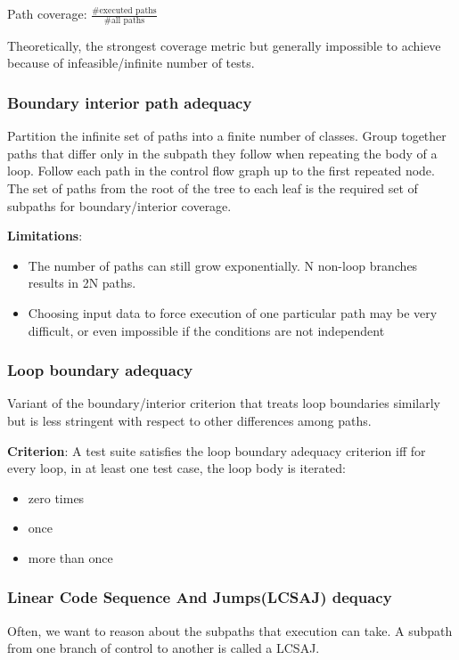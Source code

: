 \documentclass{article}
\begin{document}
Path coverage: 
$\frac{\text{\# executed paths}}{\text{\# all paths}}$

Theoretically, the strongest coverage metric but generally impossible to achieve because of infeasible/infinite number of tests.

\subsubsection{Boundary interior path adequacy}
Partition the infinite set of paths into a finite number of classes. Group together paths that differ only in the subpath they follow when repeating the body of a loop. Follow each path in the control flow graph up to the first repeated node. The set of paths from the root of the tree to each leaf is the required set of subpaths for boundary/interior coverage.

\textbf{Limitations}:
\begin{itemize}
  \item The number of paths can still grow exponentially. N non-loop branches results in 2N paths.
  \item Choosing input data to force execution of one particular path may be very difficult, or even impossible if the conditions are not independent
\end{itemize}

\subsubsection{Loop boundary adequacy}
Variant of the boundary/interior criterion that treats
loop boundaries similarly but is less stringent with
respect to other differences among paths.

\textbf{Criterion}: A test suite satisfies the loop boundary adequacy criterion iff for every loop, in at least one test case, the loop body is iterated: 
\begin{itemize}
  \item zero times
  \item once
  \item more than once
\end{itemize}

\subsubsection{Linear Code Sequence And Jumps(LCSAJ) dequacy}
Often, we want to reason about the subpaths that execution can take. A subpath from one branch of control
to another is called a LCSAJ.
\end{document}
